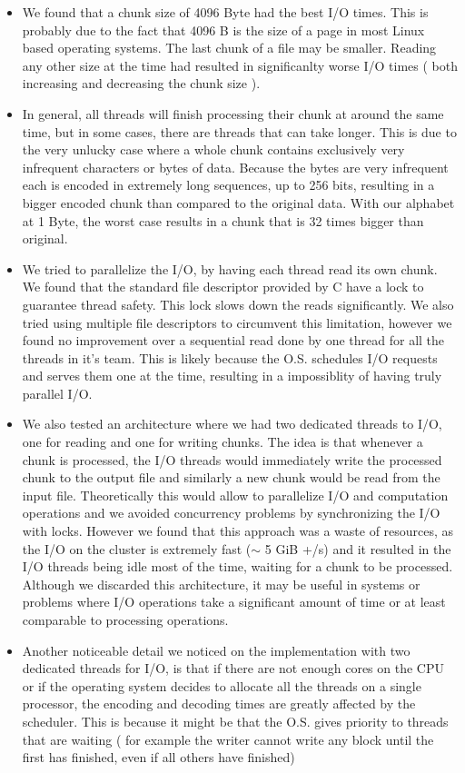 \begin{itemize}

\item We found that a chunk size of 4096 Byte had the best I/O times. This is probably due to the fact that 4096 B is the size of a page in most Linux based operating systems. The last chunk of a file may be smaller. Reading any other size at the time had resulted in significanlty worse I/O times ( both increasing and decreasing the chunk size ).

\item In general, all threads will finish processing their chunk at around the same time, but in some cases, there are threads that can take longer. This is due to the very unlucky case where a whole chunk contains exclusively very infrequent characters or bytes of data. Because the bytes are very infrequent each is encoded in extremely long sequences, up to 256 bits, resulting in a bigger encoded chunk than compared to the original data. With our alphabet at 1 Byte, the worst case results in a chunk that is 32 times bigger than original.

\item We tried to parallelize the I/O, by having each thread read its own chunk. We found that the standard file descriptor provided by C have a lock to guarantee thread safety.  This lock slows down the reads significantly. We also tried using multiple file descriptors to circumvent this limitation, however we found no improvement over a sequential read done by one thread for all the threads in it's team. This is likely because the O.S. schedules I/O requests and serves them one at the time, resulting in a impossiblity of having truly parallel I/O.

\item We also tested an architecture where we had two dedicated threads to I/O, one for reading and one for writing chunks. The idea is that whenever a chunk is processed, the I/O threads would immediately write the processed chunk to the output file and similarly a new chunk would be read from the input file. Theoretically this would allow to parallelize I/O and computation operations and we avoided concurrency problems by synchronizing the I/O with locks. However we found that this approach was a waste  of resources, as the I/O on the cluster is extremely fast ($\sim$ 5 GiB +/s) and it resulted in the I/O threads being idle most of the time, waiting for a chunk to be processed. Although we discarded this architecture, it may be useful in systems or problems where I/O operations take a significant amount of time or at least comparable to processing operations. 
\item Another noticeable detail we noticed on the implementation with two dedicated threads for I/O, is that if there are not enough cores on the CPU or if the operating system decides to allocate all the threads on a single processor, the encoding and decoding times are greatly affected by the scheduler. This is because it might be that the O.S. gives priority to threads that are waiting ( for example the writer cannot write any block until the first has finished, even if all others have finished)

\end{itemize}
